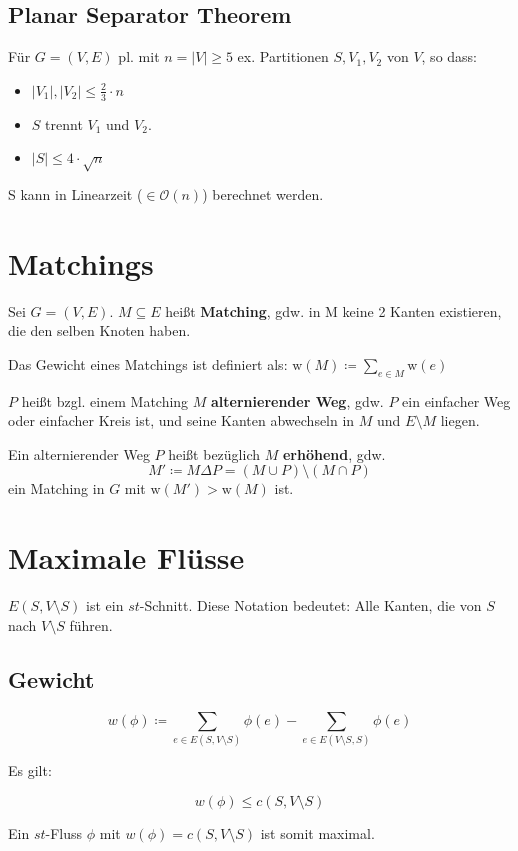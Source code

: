 \documentclass[a4paper,11pt]{report}
\begin{document}
\section{Planar Separator Theorem}
Für $G = (V, E)$ pl. mit $n = |V| \geq 5$ ex. Partitionen $S, V_1, V_2$ von $V$, so dass:
\begin{itemize}
    \item $|V_1|, |V_2| \leq \frac{2}{3} \cdot n$
    \item $S$ trennt $V_1$ und $V_2$.
    \item $|S| \leq 4 \cdot \sqrt{n}$
\end{itemize}

S kann in Linearzeit ($\in \mathcal{O}(n)$) berechnet werden.


\chapter{Matchings}
Sei $G = (V, E)$. $M \subseteq E$ heißt {\bf Matching}, gdw. in M keine 2 Kanten existieren, die den selben Knoten haben.

Das Gewicht eines Matchings ist definiert als: $\text{w}(M) \coloneqq \sum_{e \in M} \text{w}(e)$

$P$ heißt bzgl. einem Matching $M$ \textbf{alternierender Weg}, gdw. $P$ ein einfacher Weg oder einfacher Kreis ist, und seine Kanten abwechseln in $M$ und $E \setminus M$ liegen.

Ein alternierender Weg $P$ heißt bezüglich $M$ \textbf{erhöhend}, gdw.
\[
    M' \coloneqq M \Delta P = (M \cup P) \setminus (M \cap P)
\]
ein Matching in $G$ mit $\text{w}(M') > \text{w}(M)$ ist.


\chapter{Maximale Flüsse}
$E(S, V \setminus S)$ ist ein $st$-Schnitt. Diese Notation bedeutet: Alle Kanten, die von $S$ nach $V \setminus S$ führen.


\section{Gewicht}
\[ w(\phi) \coloneqq \sum_{e \in E(S, V \setminus S)} \phi(e) - \sum_{e \in E(V \setminus S, S)} \phi(e) \]

Es gilt:

\[ w(\phi) \leq c(S, V \setminus S) \]

Ein $st$-Fluss $\phi$ mit $w(\phi) = c(S, V \setminus S)$ ist somit maximal.
\end{document}
